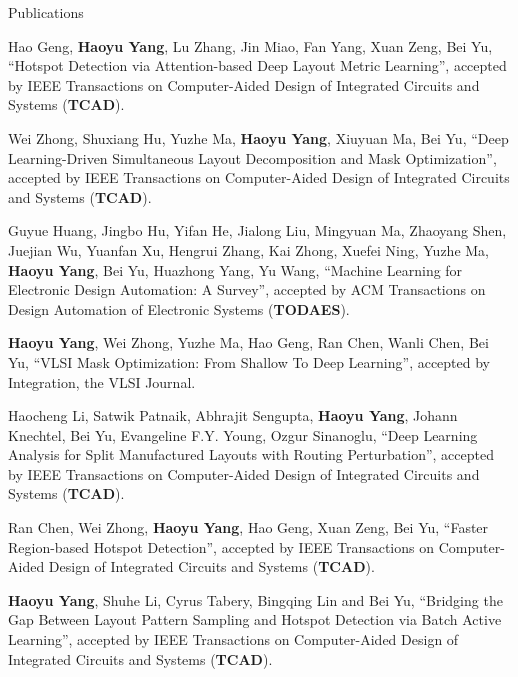 \begin{rSection}{Publications}
\begin{description}[font=\normalfont]
\item[{[J13]}]{
	Hao Geng, \textbf{Haoyu Yang}, Lu Zhang, Jin Miao, Fan Yang, Xuan Zeng, Bei Yu,
	``Hotspot Detection via Attention-based Deep Layout Metric Learning'', 
	accepted by IEEE Transactions on Computer-Aided Design of Integrated Circuits and Systems (\textbf{TCAD}).
}
	
\item[{[J12]}]{
	Wei Zhong, Shuxiang Hu, Yuzhe Ma, \textbf{Haoyu Yang}, Xiuyuan Ma, Bei Yu,
	``Deep Learning-Driven Simultaneous Layout Decomposition and Mask Optimization'', 
	accepted by IEEE Transactions on Computer-Aided Design of Integrated Circuits and Systems (\textbf{TCAD}).
}


\item[{[J11]}]{
	Guyue Huang, Jingbo Hu, Yifan He, Jialong Liu, Mingyuan Ma, Zhaoyang Shen, Juejian Wu, Yuanfan Xu, Hengrui Zhang, Kai Zhong, Xuefei Ning, Yuzhe Ma, \textbf{Haoyu Yang}, Bei Yu, Huazhong Yang, Yu Wang,
	``Machine Learning for Electronic Design Automation: A Survey'', 
	accepted by ACM Transactions on Design Automation of Electronic Systems (\textbf{TODAES}).
}
	
\item[{[J10]}]{
	\textbf{Haoyu Yang}, Wei Zhong, Yuzhe Ma, Hao Geng, Ran Chen, Wanli Chen, Bei Yu,
	``VLSI Mask Optimization: From Shallow To Deep Learning'', 
	accepted by Integration, the VLSI Journal.
}

\item[{[J9]}]{
	Haocheng Li, Satwik Patnaik, Abhrajit Sengupta, \textbf{Haoyu Yang}, Johann Knechtel, Bei Yu, Evangeline F.Y. Young, Ozgur Sinanoglu, 
	``Deep Learning Analysis for Split Manufactured Layouts with Routing Perturbation'',  
	accepted by IEEE Transactions on Computer-Aided Design of Integrated Circuits and Systems (\textbf{TCAD}).
}
	
\item[{[J8]}]{
	Ran Chen, Wei Zhong, \textbf{Haoyu Yang}, Hao Geng, Xuan Zeng, Bei Yu, ``Faster Region-based Hotspot Detection'',  
	accepted by IEEE Transactions on Computer-Aided Design of Integrated Circuits and Systems (\textbf{TCAD}).
}
	
\item[{[J7]}]{
	\textbf{Haoyu Yang}, Shuhe Li, Cyrus Tabery, Bingqing Lin and Bei Yu, ``Bridging the Gap Between Layout Pattern Sampling and Hotspot Detection via Batch Active Learning'', accepted by IEEE Transactions on Computer-Aided Design of Integrated Circuits and Systems (\textbf{TCAD}).
}	


\end{description}
\end{rSection}
